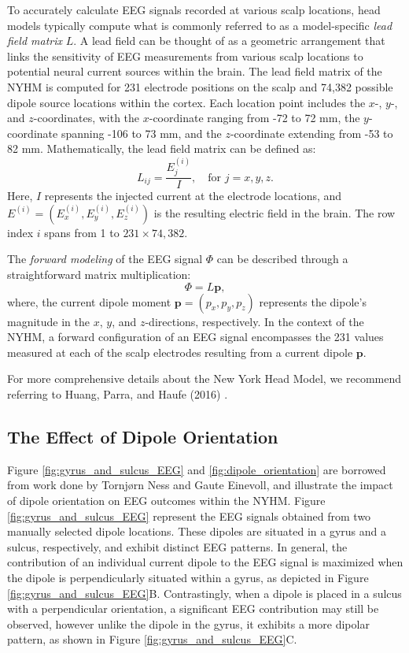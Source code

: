 \documentclass[a4paper, UKenglish, 11pt]{uiomaster}
\begin{document}
To accurately calculate EEG signals recorded at various scalp locations, head models typically compute what is commonly referred to as a model-specific \emph{lead field matrix} \(L\). A lead field can be thought of as a geometric arrangement that links the sensitivity of EEG measurements from various scalp locations to potential neural current sources within the brain. The lead field matrix of the NYHM is computed for 231 electrode positions on the scalp and 74,382 possible dipole source locations within the cortex. Each location point includes the \(x\)-, \(y\)-, and \(z\)-coordinates, with the \(x\)-coordinate ranging from -72 to 72 mm, the \(y\)-coordinate spanning -106 to 73 mm, and the \(z\)-coordinate extending from -53 to 82 mm. Mathematically, the lead field matrix can be defined as:
\begin{equation}
  L_{ij} = \frac{E_j^{(i)}}{I}, \quad \text{for } j = x, y, z.
  \label{eq:LeadFieldMatrix}
\end{equation}
Here, \(I\) represents the injected current at the electrode locations, and \({E}^{(i)} = (E_x^{(i)}, E_y^{(i)}, E_z^{(i)})\) is the resulting electric field in the brain. The row index \(i\) spans from 1 to \(231 \times 74,382\).

The \emph{forward modeling} of the EEG signal \(\Phi\) can be described through a straightforward matrix multiplication:
\begin{equation}
  \Phi = L \mathbf{p},
  \label{eq:EEG_signal_matrix}
\end{equation}
where, the current dipole moment \(\mathbf{p} = (p_x, p_y, p_z)\) represents the dipole's magnitude in the \(x\), \(y\), and \(z\)-directions, respectively. In the context of the NYHM, a forward configuration of an EEG signal encompasses the 231 values measured at each of the scalp electrodes resulting from a current dipole \(\mathbf{p}\).

For more comprehensive details about the New York Head Model, we recommend referring to Huang, Parra, and Haufe (2016) \cite{huang2016new}.




\subsection{The Effect of Dipole Orientation}
Figure \ref{fig:gyrus_and_sulcus_EEG} and \ref{fig:dipole_orientation} are borrowed from work done by Tornjørn Ness and Gaute Einevoll, and illustrate the impact of dipole orientation on EEG outcomes within the NYHM. Figure \ref{fig:gyrus_and_sulcus_EEG} represent the EEG signals obtained from two manually selected dipole locations. These dipoles are situated in a gyrus and a sulcus, respectively, and exhibit distinct EEG patterns. In general, the contribution of an individual current dipole to the EEG signal is maximized when the dipole is perpendicularly situated within a gyrus, as depicted in Figure \ref{fig:gyrus_and_sulcus_EEG}B. Contrastingly, when a dipole is placed in a sulcus with a perpendicular orientation, a significant EEG contribution may still be observed, however unlike the dipole in the gyrus, it exhibits a more dipolar pattern, as shown in Figure \ref{fig:gyrus_and_sulcus_EEG}C.
\end{document}

